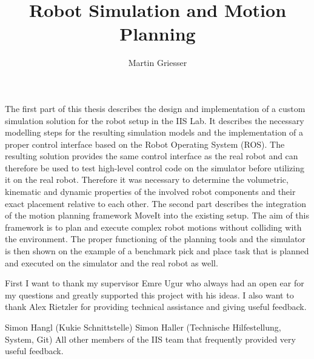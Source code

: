 \documentclass[bachelor]{iisthesis}
\title{Robot Simulation and Motion Planning}
\author{Martin Griesser}
\begin{document}
\maketitle

The first part of this thesis describes the design and implementation of a custom simulation solution for the robot setup in the IIS Lab. It describes the necessary modelling steps for the resulting simulation models and the implementation of a proper control interface based on the Robot Operating System (ROS). The resulting solution provides the same control interface as the real robot and can therefore be used to test high-level control code on the simulator before utilizing it on the real robot. Therefore it was necessary to determine the volumetric, kinematic and dynamic properties of the involved robot components and their exact placement relative to each other. The second part describes the integration of the motion planning framework MoveIt into the existing setup. The aim of this framework is to plan and execute complex robot motions without colliding with the environment. The proper functioning of the planning tools and the simulator is then shown on the example of a benchmark pick and place task that is planned and executed on the simulator and the real robot as well.


First I want to thank my supervisor Emre Ugur who always had an open ear for my questions and greatly supported this project with his ideas. I also want to thank Alex Rietzler for providing technical assistance and giving useful feedback. 

Simon Hangl (Kukie Schnittstelle)
Simon Haller (Technische Hilfestellung, System, Git)
All other members of the IIS team that frequently provided very useful feedback.

\tableofcontents
\listoffigures
\listoftables

\uibkdeclaration
\label{chap:declare}








\appendix%


\end{document}
